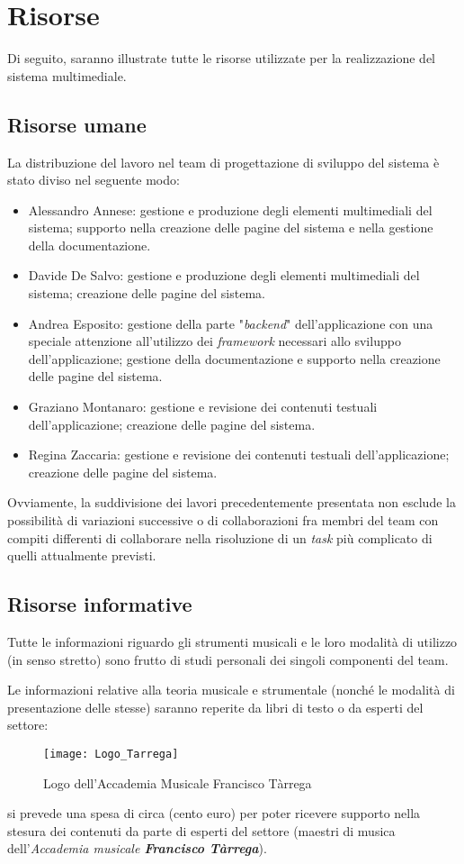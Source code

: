 \section{Risorse}
Di seguito, saranno illustrate tutte le risorse utilizzate per la realizzazione del sistema multimediale.
\subsection{Risorse umane}
La distribuzione del lavoro nel team di progettazione di sviluppo del sistema è stato diviso nel seguente modo:
\begin{itemize}
	\item Alessandro Annese: gestione e produzione degli elementi multimediali del sistema; supporto nella creazione delle pagine del sistema e nella gestione della documentazione.
	\item Davide De Salvo: gestione e produzione degli elementi multimediali del sistema; creazione delle pagine del sistema.
	\item Andrea Esposito: gestione della parte "\textit{backend}" dell'applicazione con una speciale attenzione all'utilizzo dei \textit{framework} necessari allo sviluppo dell'applicazione; gestione della documentazione e supporto nella creazione delle pagine del sistema.
	\item Graziano Montanaro: gestione e revisione dei contenuti testuali dell'applicazione; creazione delle pagine del sistema.
	\item Regina Zaccaria: gestione e revisione dei contenuti testuali dell'applicazione; creazione delle pagine del sistema.
\end{itemize}
Ovviamente, la suddivisione dei lavori precedentemente presentata non esclude la possibilità di variazioni successive o di collaborazioni fra membri del team con compiti differenti di collaborare nella risoluzione di un \textit{task} più complicato di quelli attualmente previsti.

\subsection{Risorse informative}
Tutte le informazioni riguardo gli strumenti musicali e le loro modalità di utilizzo (in senso stretto) sono frutto di studi personali dei singoli componenti del team. 

Le informazioni relative alla teoria musicale e strumentale (nonché le modalità di presentazione delle stesse) saranno reperite da libri di testo o da esperti del settore: 
\begin{wrapfigure}{r}{0.45\textwidth}
	\texttt{[image: Logo\_Tarrega]}
	\label{fig:logo-tarrega}
	\caption{Logo dell'Accademia Musicale Francisco Tàrrega}
\end{wrapfigure}
si prevede una spesa di circa  (cento euro) per poter ricevere supporto nella stesura dei contenuti da parte di esperti del settore (maestri di musica dell'\emph{Accademia musicale \textbf{Francisco Tàrrega}}). 

